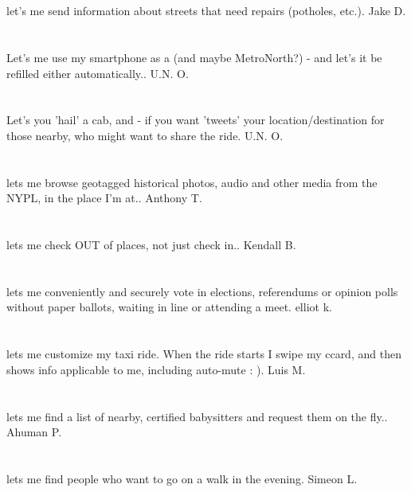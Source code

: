 \section{}let's me send information about streets that need repairs (potholes,  etc.). Jake D.
\section{}Let's me use my smartphone as a  (and maybe MetroNorth?) - and let's it be refilled either automatically.. U.N. O.
\section{}Let's you 'hail' a cab,  and - if you want 'tweets' your location/destination for those nearby,  who might want to share the ride. U.N. O.
\section{}lets me browse geotagged historical photos,  audio and other media from the NYPL,  in the place I'm at.. Anthony T.
\section{}lets me check OUT of places,  not just check in.. Kendall B.
\section{}lets me conveniently and securely vote in elections,  referendums or opinion polls without paper ballots,  waiting in line or attending a meet. elliot k.
\section{}lets me customize my taxi ride. When the ride starts I swipe my ccard,  and then shows info applicable to me,  including auto-mute : ). Luis M.
\section{}lets me find a list of nearby,  certified babysitters and request them on the fly.. Ahuman P.
\section{}lets me find people who want to go on a walk in the evening. Simeon L.
